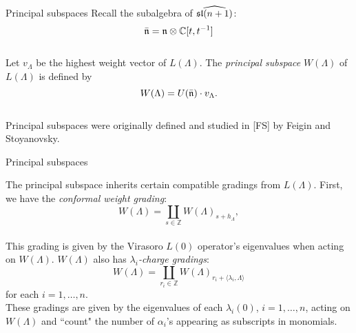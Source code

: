 \documentclass{beamer}
\begin{document}
\begin{frame}{Principal subspaces}
Recall the subalgebra of $\widehat{\frak{sl}(n+1)}$:
$$\bar{\frak{n}} = \frak{n}\otimes\mathbb{C}[t,t^{-1}]$$\\
\vspace{0.1in}
\pause
Let $v_\Lambda$ be the highest weight vector of $L(\Lambda)$.  The {\em principal subspace} $W(\Lambda)$ of $L(\Lambda)$ is defined by
$$W(\Lambda) = U(\bar{\frak{n}})\cdot v_\Lambda.$$ \\
\vspace{0.1in}
Principal subspaces were originally defined and studied in [FS] by Feigin and 
Stoyanovsky.

\end{frame}

\begin{frame}{Principal subspaces}

The principal subspace inherits certain compatible gradings from $L(\Lambda)$. First, we have the 
{\em conformal weight grading}:
\begin{equation*} \label{WWeightGrading}
W(\Lambda) = \coprod_{s \in \mathbb{Z}} W(\Lambda)_{s+h_{\Lambda}},
\end{equation*}\\

This grading is given by the Virasoro $L(0)$ operator's eigenvalues when acting on $W(\Lambda)$.
$W(\Lambda)$  also has {\em $\lambda_i$-charge gradings}:
\begin{equation*} \label{WChargeGrading}
W(\Lambda) = \coprod_{r_i \in \mathbb{Z}} W(\Lambda)_{r_i+\langle\lambda_i,\Lambda\rangle}
\end{equation*}
for each $i=1,\dots, n$.\\
These gradings are given by the eigenvalues of each $\lambda_i(0)$, $i=1,\dots, n$, acting on 
$W(\Lambda)$ and ``count" the number of $\alpha_i$'s appearing as subscripts in monomials.
\end{frame}
\end{document}
